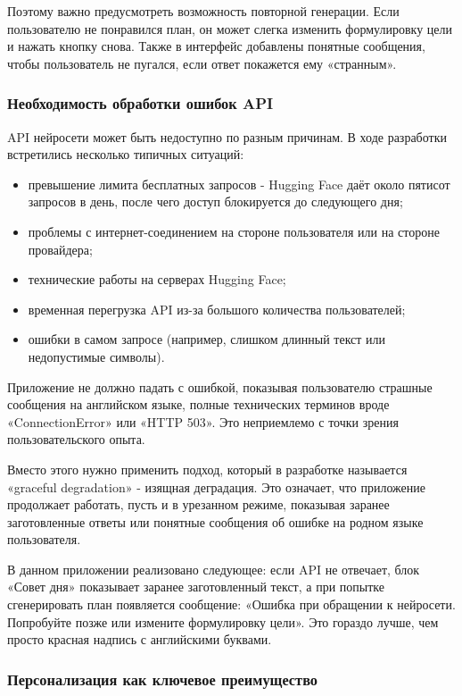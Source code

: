 \documentclass[14pt, a4paper]{extarticle}
\begin{document}
\begin{enumerate}
\vskip 5cm
\noindent Поэтому важно предусмотреть возможность повторной генерации. Если пользователю не понравился план, он может слегка изменить формулировку цели и нажать кнопку снова. Также в интерфейс добавлены понятные сообщения, чтобы пользователь не пугался, если ответ покажется ему «странным».

\subsubsection{Необходимость обработки ошибок API}

\noindent API нейросети может быть недоступно по разным причинам. В ходе разработки встретились несколько типичных ситуаций:

\begin{itemize}
\item превышение лимита бесплатных запросов - Hugging Face даёт около пятисот запросов в день, после чего доступ блокируется до следующего дня;
\item проблемы с интернет-соединением на стороне пользователя или на стороне провайдера;
\item технические работы на серверах Hugging Face;
\item временная перегрузка API из-за большого количества пользователей;
\item ошибки в самом запросе (например, слишком длинный текст или недопустимые символы).
\end{itemize}

\noindent Приложение не должно падать с ошибкой, показывая пользователю страшные сообщения на английском языке, полные технических терминов вроде «ConnectionError» или «HTTP 503». Это неприемлемо с точки зрения пользовательского опыта.

\medskip
\noindent Вместо этого нужно применить подход, который в разработке называется «graceful degradation» - изящная деградация. Это означает, что приложение продолжает работать, пусть и в урезанном режиме, показывая заранее заготовленные ответы или понятные сообщения об ошибке на родном языке пользователя.

\vskip 5cm
\noindent В данном приложении реализовано следующее: если API не отвечает, блок «Совет дня» показывает заранее заготовленный текст, а при попытке сгенерировать план появляется сообщение: «Ошибка при обращении к нейросети. Попробуйте позже или измените формулировку цели». Это гораздо лучше, чем просто красная надпись с английскими буквами.

\subsubsection{Персонализация как ключевое преимущество}


\end{enumerate}
\end{document}
